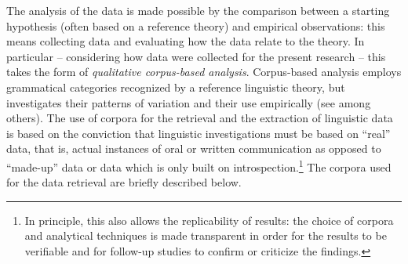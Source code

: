 The analysis of the data is made possible by the comparison between a starting hypothesis (often based on a reference theory) and empirical observations: this means collecting data and evaluating how the data relate to the theory. In particular – considering how data were collected for the present research – this takes the form of \textit{qualitative corpus-based analysis}. Corpus-based analysis employs grammatical categories recognized by a reference linguistic theory, but investigates their patterns of variation and their use empirically (see \citealt{Biber2010} among others). The use of corpora for the retrieval and the extraction of linguistic data is based on the conviction that linguistic investigations must be based on “real” data, that is, actual instances of oral or written communication as opposed to “made-up” data or data which is only built on introspection.\footnote{In principle, this also allows the replicability of results: the choice of corpora and analytical techniques is made transparent in order for the results to be verifiable and for follow-up studies to confirm or criticize the findings.} The corpora used for the data retrieval are briefly described below.

